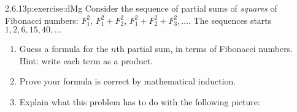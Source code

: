 \documentclass[twoside,11pt,]{book}
\numberwithin{equation}{chapter}
\begin{document}
\begin{divisionsolution}{2.6.13}{}{p:exercise:dMg}%
Consider the sequence of partial sums of \emph{squares} of Fibonacci numbers: \(F_1^2\), \(F_1^2 + F_2^2\), \(F_1^2 + F_2^2 + F_3^2, \ldots\).  The sequences starts \(1, 2, 6, 15, 40,\ldots\)%
\begin{enumerate}[label=(\alph*)]
\item{}Guess a formula for the \(n\)th partial sum, in terms of Fibonacci numbers.  Hint: write each term as a product.%
\item{}Prove your formula is correct by mathematical induction.%
\item{}Explain what this problem has to do with the following picture:%
\begin{sidebyside}{1}{0.375}{0.375}{0}%
\begin{sbspanel}{0.25}%
%
\end{sbspanel}%
\end{sidebyside}%
\end{enumerate}
%
\end{divisionsolution}%
\end{document}
